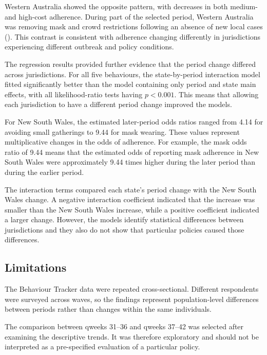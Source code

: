 \documentclass[
  12pt,
  a4paper,
]{article}
\begin{document}
Western Australia showed the opposite pattern, with decreases in both
medium- and high-cost adherence. During part of the selected period,
Western Australia was removing mask and crowd restrictions following an
absence of new local cases (). This contrast is
consistent with adherence changing differently in jurisdictions
experiencing different outbreak and policy conditions.

The regression results provided further evidence that the period change
differed across jurisdictions. For all five behaviours, the
state-by-period interaction model fitted significantly better than the
model containing only period and state main effects, with all
likelihood-ratio tests having \(p < 0.001\). This means that allowing each
jurisdiction to have a different period change improved the models.

For New South Wales, the estimated later-period odds ratios ranged from
4.14 for avoiding small gatherings to 9.44 for mask wearing. These
values represent multiplicative changes in the odds of adherence. For
example, the mask odds ratio of 9.44 means that the estimated odds of
reporting mask adherence in New South Wales were approximately 9.44
times higher during the later period than during the earlier period.

The interaction terms compared each state's period change with
the New South Wales change. A negative interaction coefficient indicated
that the increase was smaller than the New South Wales increase, while a
positive coefficient indicated a larger change. However, the models
identify statistical differences between jurisdictions and they also do not
show that particular policies caused those differences.

\subsection{Limitations}\label{limitations}

The Behaviour Tracker data were repeated cross-sectional. Different respondents were surveyed across waves, so the findings represent population-level differences between periods rather than changes within the same individuals.

The comparison between qweeks 31--36 and qweeks 37--42 was selected
after examining the descriptive trends. It was therefore exploratory and
should not be interpreted as a pre-specified evaluation of a particular
policy.
\end{document}
